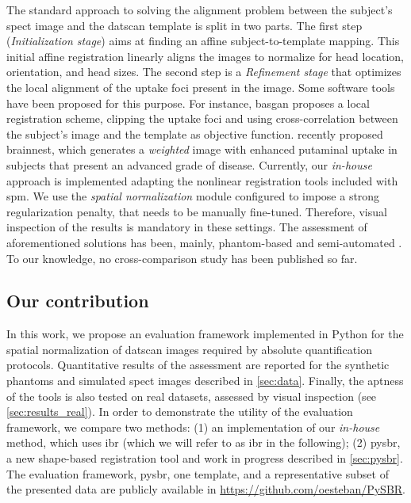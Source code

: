 \documentclass{frontiers}
\newcommand{\cbstart}{\relax}
\newcommand{\cbend}{\relax}
\begin{document}
The standard approach to solving the alignment problem between the subject's
  \gls*{spect} image and the \gls*{datscan} template is split in two parts.
The first step (\emph{Initialization stage}) aims at finding an affine subject-to-template mapping.
This initial affine registration linearly aligns the images to normalize for 
   head location, orientation, and head sizes.
The second step is a \emph{Refinement stage} that optimizes the local alignment of
  the uptake foci present in the image.
Some software tools have been proposed for this purpose.
For instance, \gls*{basgan} proposes a local registration scheme, clipping the 
  uptake foci and using cross-correlation between the subject's image and 
  the template as objective function.
\citeauthor{ciarmiello_weighted_2013} recently proposed \gls*{brainnest}, which
  generates a \emph{weighted} image with enhanced putaminal uptake in
  subjects that present an advanced grade of disease.
\cbstart
Currently, our \emph{in-house} approach is implemented adapting the nonlinear registration
  tools included with \gls*{spm}.
We use the \emph{spatial normalization} module configured to impose a strong regularization penalty,
  that needs to be manually fine-tuned.
Therefore, visual inspection of the results is mandatory in these settings.
\cbend
The assessment of aforementioned solutions has been, mainly, phantom-based
  and semi-automated \citep{skanjeti_assessing_2013}.
To our knowledge, no cross-comparison study has been published so far.


\cbstart
\subsection{Our contribution}\label{sec:contribution}
In this work, we propose an evaluation framework implemented in Python for the
  spatial normalization of \gls*{datscan} images required by absolute quantification
  protocols.
Quantitative results of the assessment are reported for the synthetic
  phantoms and simulated \gls*{spect} images described in \autoref{sec:data}.
Finally, the aptness of the tools is also tested on real datasets,
  assessed by visual inspection (see \autoref{sec:results_real}).
In order to demonstrate the utility of the evaluation framework, we compare 
  two methods:
(1) an implementation of our \emph{in-house} method, which uses \acrlong*{ibr}
  (which we will refer to as \acrshort*{ibr} in the following);
(2) \gls*{pysbr}, a new shape-based registration tool and
  work in progress described in \autoref{sec:pysbr}.
\cbend
The evaluation framework, \gls*{pysbr}, one template,
  and a representative subset of the presented data are publicly 
  available in \url{https://github.com/oesteban/PySBR}.
\end{document}
